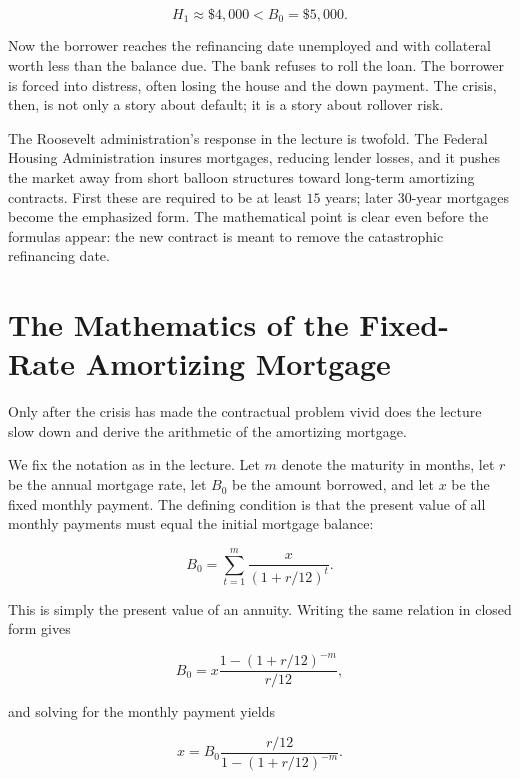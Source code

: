 \begin{equation}
H_1 \approx \$4{,}000 < B_0 = \$5{,}000.
\end{equation}

Now the borrower reaches the refinancing date unemployed and with collateral worth less than the balance due. The bank refuses to roll the loan. The borrower is forced into distress, often losing the house and the down payment. The crisis, then, is not only a story about default; it is a story about rollover risk.

The Roosevelt administration's response in the lecture is twofold. The Federal Housing Administration insures mortgages, reducing lender losses, and it pushes the market away from short balloon structures toward long-term amortizing contracts. First these are required to be at least \(15\) years; later \(30\)-year mortgages become the emphasized form. The mathematical point is clear even before the formulas appear: the new contract is meant to remove the catastrophic refinancing date.

\section{The Mathematics of the Fixed-Rate Amortizing Mortgage}

Only after the crisis has made the contractual problem vivid does the lecture slow down and derive the arithmetic of the amortizing mortgage.

We fix the notation as in the lecture. Let \(m\) denote the maturity in months, let \(r\) be the annual mortgage rate, let \(B_0\) be the amount borrowed, and let \(x\) be the fixed monthly payment. The defining condition is that the present value of all monthly payments must equal the initial mortgage balance:

\begin{equation}
B_0 = \sum_{t=1}^{m} \frac{x}{(1+r/12)^t}.
\end{equation}

This is simply the present value of an annuity. Writing the same relation in closed form gives

\begin{equation}
B_0
=
x \frac{1-(1+r/12)^{-m}}{r/12},
\end{equation}

and solving for the monthly payment yields

\begin{equation}
x
=
B_0 \frac{r/12}{1-(1+r/12)^{-m}}.
\end{equation}

